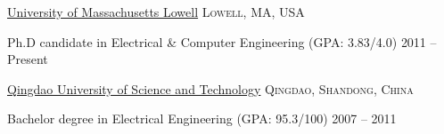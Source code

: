 \documentclass[10pt,a4paper]{article} %
\begin{document}
\spacedhrule{0.5em}{-0.4em} %



\headedsection %
{\href{http://www.uml.edu}{University of Massachusetts Lowell}}
{\textsc{Lowell, MA, USA}} {

\headedsubsection %
{Ph.D candidate in Electrical \& Computer Engineering (GPA: 3.83/4.0)}
{2011 -- Present}
{}
}


\headedsection %
{\href{http://www.qust.edu.cn}{Qingdao University of Science and Technology}}
{\textsc{Qingdao, Shandong, China}} {

\headedsubsection %
{Bachelor degree in Electrical Engineering (GPA: 95.3/100)}
{2007 -- 2011} {}
}

%
%


\spacedhrule{0.5em}{-0.4em} %


\end{document}
